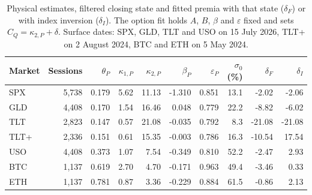 \documentclass[11pt,a4paper]{article}
\theoremstyle{definition}
\theoremstyle{remark}
\begin{document}
\begin{table}[htbp]\centering\small
\setlength{\tabcolsep}{3.5pt}
\begin{tabular}{@{}lrrrrrrrrr@{}}\toprule
Market & Sessions & $\theta_P$ & $\kappa_{1,P}$ & $\kappa_{2,P}$ & $\beta_P$ &
$\varepsilon_P$ & $\sigma_0$ (\%) & $\delta_F$ & $\delta_I$\\\midrule
SPX & 5,738 & 0.179 & 5.62 & 11.13 & -1.310 & 0.851 & 13.1 & -2.02 & -2.06 \\
GLD & 4,408 & 0.170 & 1.54 & 16.46 & 0.048 & 0.779 & 22.2 & -8.82 & -6.02 \\
TLT & 2,823 & 0.147 & 0.57 & 21.08 & -0.035 & 0.792 & 8.3 & -21.08 & -21.08 \\
TLT+ & 2,336 & 0.151 & 0.61 & 15.35 & -0.003 & 0.786 & 16.3 & -10.54 & 17.54 \\
USO & 4,408 & 0.373 & 1.07 & 7.54 & -0.349 & 0.810 & 52.2 & -2.47 & 2.93 \\
BTC & 1,137 & 0.619 & 2.70 & 4.70 & -0.171 & 0.963 & 49.4 & -3.46 & 0.33 \\
ETH & 1,137 & 0.781 & 0.87 & 3.36 & -0.229 & 0.884 & 61.5 & -0.86 & 2.13 \\
\bottomrule\end{tabular}
\caption{Physical estimates, filtered closing state and fitted premia with that
state ($\delta_F$) or with index inversion ($\delta_I$).
The option fit holds $A$, $B$, $\beta$ and $\varepsilon$ fixed and sets
$C_Q=\kappa_{2,P}+\delta$. Surface dates: SPX, GLD, TLT and USO on 15 July 2026, TLT+ on 2 August 2024, BTC and ETH on 5 May 2024.}
\label{tab:asset-historical}\end{table}
\end{document}
